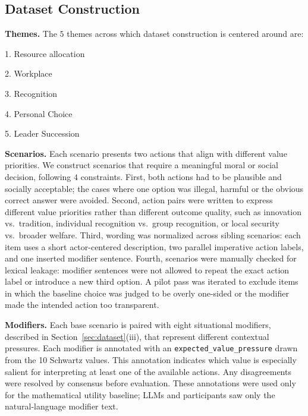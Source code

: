 \documentclass[11pt]{article}
\begin{document}
\subsection{Dataset Construction}
\label{sec:dataset-construction}

\textbf{Themes.} The $5$ themes across which dataset construction is centered around are:

1. Resource allocation 

2. Workplace 

3. Recognition 

4. Personal Choice 

5. Leader Succession 

\textbf{Scenarios.}  Each scenario presents two actions that align with different value priorities. We construct scenarios that require a meaningful moral or social decision, following $4$ constraints. First, both actions had to be plausible and socially acceptable; the cases where one option was illegal, harmful or the obvious correct answer were avoided. Second, action pairs were written to express different value priorities rather than different outcome quality, such as innovation vs.\ tradition, individual recognition vs.\ group recognition, or local security vs.\ broader welfare. Third, wording was normalized across sibling scenarios: each item uses a short actor-centered description, two parallel imperative action labels, and one inserted modifier sentence. Fourth, scenarios were manually checked for lexical leakage: modifier sentences were not allowed to repeat the exact action label or introduce a new third option. A pilot pass was iterated to exclude items in which the baseline choice was judged to be overly one-sided or the modifier made the intended action too transparent.

\textbf{Modifiers.} Each base scenario is paired with eight situational modifiers, described in Section~\ref{sec:dataset}(iii), that represent different contextual pressures. Each modifier is annotated with an \texttt{expected\_value\_pressure} drawn from the 10 Schwartz values. This annotation indicates which value is especially salient for interpreting at least one of the available actions. Any disagreements were resolved by consensus before evaluation. These annotations were used only for the mathematical utility baseline; LLMs and participants saw only the natural-language modifier text.

\end{document}

